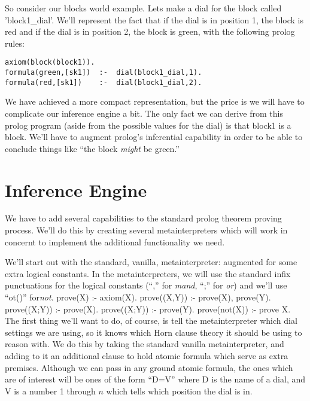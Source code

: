 \documentclass{book}[9pt]
\newenvironment{code}%
{\small \verbatim}%
{\endverbatim \large}
\begin{document}
So consider our blocks world example.  Lets make a dial for the
block called 'block1\_dial'.  We'll represent the fact that if the dial
is in position 1, the block is red and if the dial is in position 2,
the block is green, with the following prolog rules:
\begin{verbatim}
axiom(block(block1)).
formula(green,[sk1])  :-  dial(block1_dial,1).
formula(red,[sk1])    :-  dial(block1_dial,2).
\end{verbatim}

We have achieved a more compact representation, but the price is we
will have to complicate our inference engine a bit.  The only fact we
can derive from this prolog program (aside from the possible values
for the dial) is that block1 is a block.  We'll have to augment
prolog's inferential capability in order to be able to conclude things
like ``the block {\em might} be green.''

\section{Inference Engine}

We have to add several capabilities to the standard prolog theorem
proving process.  We'll do this by creating several metainterpreters
which will work in concernt to implement the additional functionality
we need.

We'll start out with the standard, vanilla, metainterpreter:
augmented for some extra logical constants.  In the
metainterpreters, we will use the standard infix punctuations for the
logical constants (``,'' for {\em mand}, ``;'' for {\em or}) and we'll
use ``ot()'' for{\em not}.
\begin{code}
prove(X) :- axiom(X).
prove((X,Y)) :- prove(X), prove(Y).
prove((X;Y)) :- prove(X).
prove((X;Y)) :- prove(Y).
prove(not(X)) :- \+ prove X.
\end{code}
\noindent The first thing we'll want to do, of course, is tell the
metainterpreter which dial settings we are using, so it knows which
Horn clause theory it should be using to reason with.  We do this
by taking the standard vanilla metainterpreter, and adding to it an
additional clause to hold atomic formula which serve as extra
premises.  Although we can pass in any ground atomic formula, the ones
which are of interest will be ones of the form ``D=V'' where D is the
name of a dial, and V is a number 1 through $n$ which tells which
position the dial is in.
\end{document}
